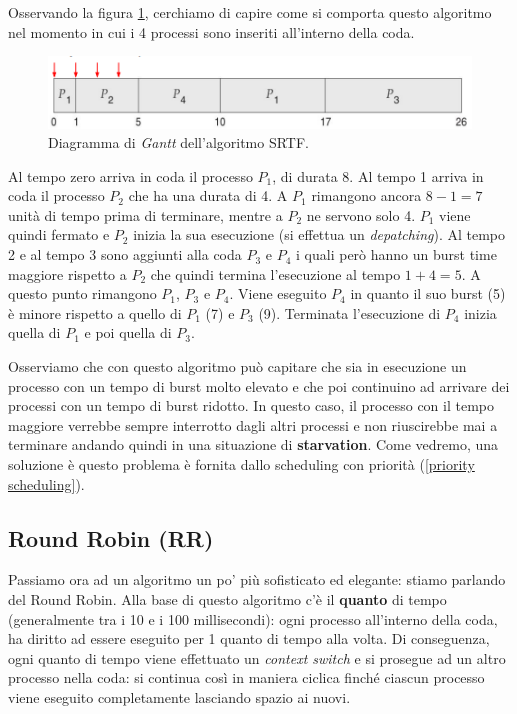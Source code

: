 Osservando la figura \ref{fig:SRTF}, cerchiamo di capire come si comporta questo algoritmo nel momento in cui i 4 processi sono inseriti all'interno della coda.
\begin{figure}[h]
    \centering
    \includegraphics[width = .75\textwidth]{../res/imgs/CPU scheduling/SRTF.png}
    \caption{Diagramma di \textit{Gantt} dell'algoritmo SRTF.}
    \label{fig:SRTF}
\end{figure}
Al tempo zero arriva in coda il processo $P_1$, di durata 8. Al tempo 1 arriva in coda il processo $P_2$ che ha una durata di 4. A $P_1$ rimangono ancora $8 - 1 = 7$ unità di tempo prima di terminare, mentre a $P_2$ ne servono solo 4. $P_1$ viene quindi fermato e $P_2$ inizia la sua esecuzione (si effettua un \textit{depatching}). Al tempo 2 e al tempo 3 sono aggiunti alla coda $P_3$ e $P_4$ i quali però hanno un burst time maggiore rispetto a $P_2$ che quindi termina l'esecuzione al tempo $1 + 4 = 5$. A questo punto rimangono $P_1$, $P_3$ e $P_4$. Viene eseguito $P_4$ in quanto il suo burst (5) è minore rispetto a quello di $P_1$ (7) e $P_3$ (9). Terminata l'esecuzione di $P_4$ inizia quella di $P_1$ e poi quella di $P_3$.

Osserviamo che con questo algoritmo può capitare che sia in esecuzione un processo con un tempo di burst molto elevato e che poi continuino ad arrivare dei processi con un tempo di burst ridotto. In questo caso, il processo con il tempo maggiore verrebbe sempre interrotto dagli altri processi e non riuscirebbe mai a terminare andando quindi in una situazione di \textbf{starvation}. Come vedremo, una soluzione è questo problema è fornita dallo scheduling con priorità (\ref{priority scheduling}).

% 
\subsection{Round Robin (RR)}\label{RR}
Passiamo ora ad un algoritmo un po' più sofisticato ed elegante: stiamo parlando del Round Robin. Alla base di questo algoritmo c'è il \textbf{quanto} di tempo (generalmente tra i 10 e i 100 millisecondi): ogni processo all'interno della coda, ha diritto ad essere eseguito per 1 quanto di tempo alla volta. Di conseguenza, ogni quanto di tempo viene effettuato un \textit{context switch} e si prosegue ad un altro processo nella coda: si continua così in maniera ciclica finché ciascun processo viene eseguito completamente lasciando spazio ai nuovi.

